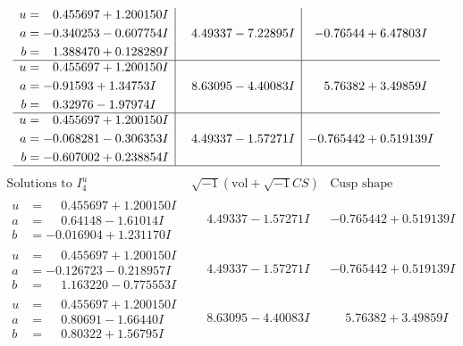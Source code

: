 \documentclass[1p]{elsarticle_modified}
\theoremstyle{definition}
\newcommand{\I}{\sqrt{-1}}
\begin{document}
$$\begin{array}{c|c|c}
\begin{aligned}
u &= \phantom{-}0.455697 + 1.200150 I \\
a &= -0.340253 - 0.607754 I \\
b &= \phantom{-}1.388470 + 0.128289 I\end{aligned}
 & \phantom{-}4.49337 - 7.22895 I & -0.76544 + 6.47803 I \\ \hline\begin{aligned}
u &= \phantom{-}0.455697 + 1.200150 I \\
a &= -0.91593 + 1.34753 I \\
b &= \phantom{-}0.32976 - 1.97974 I\end{aligned}
 & \phantom{-}8.63095 - 4.40083 I & \phantom{-}5.76382 + 3.49859 I \\ \hline\begin{aligned}
u &= \phantom{-}0.455697 + 1.200150 I \\
a &= -0.068281 - 0.306353 I \\
b &= -0.607002 + 0.238854 I\end{aligned}
 & \phantom{-}4.49337 - 1.57271 I & -0.765442 + 0.519139 I\\
 \hline 
 \end{array}$$\newpage$$\begin{array}{c|c|c}  
\text{Solutions to }I^u_{4}& \I (\text{vol} + \sqrt{-1}CS) & \text{Cusp shape}\\
 \hline 
\begin{aligned}
u &= \phantom{-}0.455697 + 1.200150 I \\
a &= \phantom{-}0.64148 - 1.61014 I \\
b &= -0.016904 + 1.231170 I\end{aligned}
 & \phantom{-}4.49337 - 1.57271 I & -0.765442 + 0.519139 I \\ \hline\begin{aligned}
u &= \phantom{-}0.455697 + 1.200150 I \\
a &= -0.126723 - 0.218957 I \\
b &= \phantom{-}1.163220 - 0.775553 I\end{aligned}
 & \phantom{-}4.49337 - 1.57271 I & -0.765442 + 0.519139 I \\ \hline\begin{aligned}
u &= \phantom{-}0.455697 + 1.200150 I \\
a &= \phantom{-}0.80691 - 1.66440 I \\
b &= \phantom{-}0.80322 + 1.56795 I\end{aligned}
 & \phantom{-}8.63095 - 4.40083 I & \phantom{-}5.76382 + 3.49859 I \\ \hline\begin{aligned}

\end{aligned}
\end{array}$$
\end{document}
